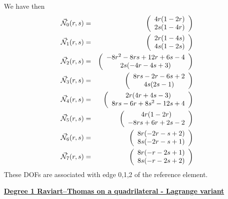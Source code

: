 We have then
\begin{eqnarray}
\vec{{\mathcal{N}}}_0(r,s) &=& \left( \begin{array}{c} 4r(1-2r)\\2s(1-4r)  \end{array} \right) \nonumber\\
\vec{{\mathcal{N}}}_1(r,s) &=& \left( \begin{array}{c} 2r(1-4s)\\4s(1-2s)  \end{array} \right) \nonumber\\
\vec{{\mathcal{N}}}_2(r,s) &=& \left( \begin{array}{c} -8r^2-8rs+12r+6s-4\\2s(-4r-4s+3)  \end{array} \right) \nonumber\\
\vec{{\mathcal{N}}}_3(r,s) &=& \left( \begin{array}{c} 8rs-2r-6s+2\\4s(2s-1)  \end{array} \right) \nonumber\\
\vec{{\mathcal{N}}}_4(r,s) &=& \left( \begin{array}{c} 2r(4r+4s-3)\\8rs-6r+8s^2-12s+4  \end{array} \right) \nonumber\\
\vec{{\mathcal{N}}}_5(r,s) &=& \left( \begin{array}{c} 4r(1-2r)\\-8rs+6r+2s-2  \end{array} \right) \nonumber\\
\vec{{\mathcal{N}}}_6(r,s) &=& \left( \begin{array}{c} 8r(-2r-s+2)\\8s(-2r-s+1)  \end{array} \right) \nonumber\\
\vec{{\mathcal{N}}}_7(r,s) &=& \left( \begin{array}{c} 8r(-r-2s+1)\\8s(-r-2s+2)  \end{array} \right) \nonumber
\end{eqnarray}
These DOFs are associated with edge 0,1,2 of the reference element.






\vspace{.5cm}
\noindent
\underline{\bf Degree 1 Raviart–Thomas on a quadrilateral - Lagrange variant}

